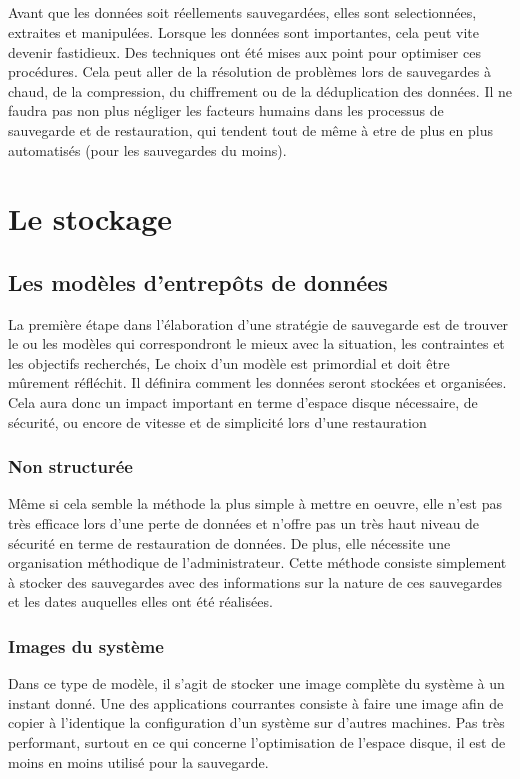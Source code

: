 \documentclass[a4paper,11pt]{report}
\begin{document}
\paragraph{}
Avant que les données soit réellements sauvegardées, elles sont selectionnées, extraites et manipulées. Lorsque les données sont importantes, cela peut vite devenir fastidieux.
Des techniques ont été mises aux point pour optimiser ces procédures. Cela peut aller de la résolution de problèmes lors de sauvegardes à chaud, de la compression, du chiffrement ou de la déduplication des données.
Il ne faudra pas non plus négliger les facteurs humains dans les processus de sauvegarde et de restauration, qui tendent tout de même à etre de plus en plus automatisés (pour les sauvegardes du moins).


\chapter{Le stockage}

\section{Les modèles d'entrepôts de données}
La première étape dans l'élaboration d'une stratégie de sauvegarde est de trouver le ou les modèles qui correspondront le mieux avec la situation, les contraintes et les objectifs recherchés, 
Le choix d'un modèle est primordial et doit être mûrement réfléchit. Il définira comment les données seront stockées et organisées. Cela aura donc un impact important en terme d'espace disque nécessaire, de sécurité, ou encore de vitesse et de simplicité lors d'une restauration

\subsection{Non structurée}
Même si cela semble la méthode la plus simple à mettre en oeuvre, elle n'est pas très efficace lors d'une perte de données et n'offre pas un très haut niveau de sécurité en terme de restauration de données.
De plus, elle nécessite une organisation méthodique de l'administrateur.
Cette méthode consiste simplement à stocker des sauvegardes avec des informations sur la nature de ces sauvegardes et les dates auquelles elles ont été réalisées.

\subsection{Images du système}
Dans ce type de modèle, il s'agit de stocker une image complète du système à un instant donné. Une des applications courrantes consiste à faire une image afin de copier à l'identique la configuration d'un système sur d'autres machines.
Pas très performant, surtout en ce qui concerne l'optimisation de l'espace disque, il est de moins en moins utilisé pour la sauvegarde.
\end{document}
